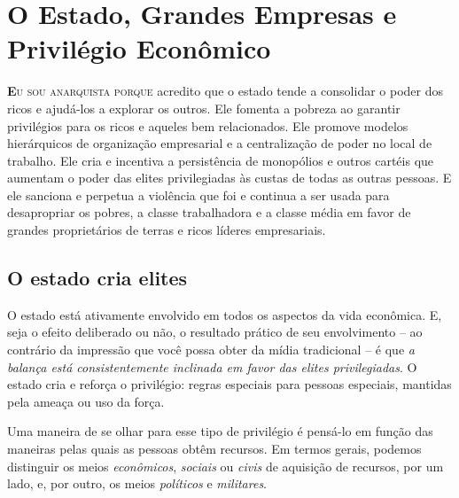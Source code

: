 
\chapter{O Estado, Grandes Empresas e Privilégio Econômico}
\label{chap:3}

\lettrine[lines=2]{\textcolor{LettrineColor}{\textbf{E}}}{u sou anarquista porque} acredito que o estado tende a consolidar o poder dos ricos e ajudá-los a explorar os outros. Ele fomenta a pobreza ao garantir privilégios para os ricos e aqueles bem relacionados. Ele promove modelos hierárquicos de organização empresarial e a centralização de poder no local de trabalho. Ele cria e incentiva a persistência de monopólios e outros cartéis que aumentam o poder das elites privilegiadas às custas de todas as outras pessoas. E ele sanciona e perpetua a violência que foi e continua a ser usada para desapropriar os pobres, a classe trabalhadora e a classe média em favor de grandes proprietários de terras e ricos líderes empresariais.

\section{O estado cria elites}

O estado está ativamente envolvido em todos os aspectos da vida econômica. E, seja o efeito deliberado ou não, o resultado prático de seu envolvimento -- ao contrário da impressão que você possa obter da mídia tradicional -- é que \emph{a balança está consistentemente inclinada em favor das elites privilegiadas}. O estado cria e reforça o privilégio: regras especiais para pessoas especiais, mantidas pela ameaça ou uso da força.

Uma maneira de se olhar para esse tipo de privilégio é pensá-lo em função das maneiras pelas quais as pessoas obtêm recursos. Em termos gerais, podemos distinguir os meios \emph{econômicos}, \emph{sociais} ou \emph{civis} de aquisição de recursos, por um lado, e, por outro, os meios \emph{políticos} e \emph{militares}.

